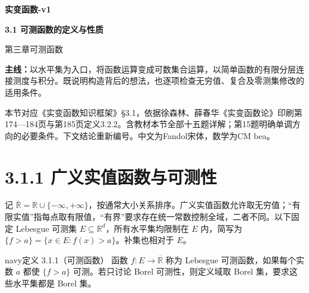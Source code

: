 \documentclass[11pt,a4paper]{article}
\begin{document}
\begin{center}{\LARGE\bfseries 实变函数-v1\par}\vspace{7pt}
{\Large\bfseries 3.1 可测函数的定义与性质\par}\vspace{6pt}
{第三章\quad 可测函数\par}\end{center}
\textbf{主线：}以水平集为入口，将函数运算变成可数集合运算，以简单函数的有限分层连接测度与积分。既说明构造背后的想法，也逐项检查无穷值、复合及零测集修改的适用条件。
\begin{center}
\end{center}
本节对应《实变函数知识框架》\S3.1，依据徐森林、薛春华《实变函数论》印刷第174—184页与第185页定义3.2.2。含教材本节全部十五题详解；第15题明确单调方向的必要条件。下文结论重新编号。中文为Fandol宋体，数学为CM bea。
\begingroup\small\setlength{\parskip}{0pt}\tableofcontents\endgroup
\newpage
{}\section[\S{}3.1.1
广义实值函数与可测性]{3.1.1
广义实值函数与可测性}\label{ux5e7fux4e49ux5b9eux503cux51fdux6570ux4e0eux53efux6d4bux6027}

记
\(\overline{\mathbb R}=\mathbb R\cup\{-\infty,+\infty\}\)，按通常大小关系排序。广义实值函数允许取无穷值；``有限实值''指每点取有限值，``有界''要求存在统一常数控制全域，二者不同。以下固定
Lebesgue 可测集 \(E\subseteq\mathbb R^d\)，所有水平集均限制在 \(E\)
内，简写为 \(\{f>a\}=\{x\in E:f(x)>a\}\)。补集也相对于 \(E\)。

\begin{sboxenv}{navy}{定义 3.1.1（可测函数）}
函数 \(f:E\to\overline{\mathbb R}\) 称为 Lebesgue 可测函数，如果每个实数
\(a\) 都使 \(\{f>a\}\) 可测。若只讨论 Borel 可测性，则定义域取 Borel
集，要求这些水平集都是 Borel 集。

\end{sboxenv}
\end{document}
